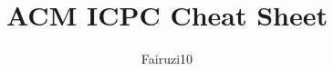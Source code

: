 \documentclass[a4paper, landscape]{article}
\title{\textbf{ACM ICPC Cheat Sheet}}
\author{Fairuzi10}
\date{}
\begin{document}
\setlength{\columnseprule}{0.4pt}
\begin{multicols}{5}
	\tableofcontents
\end{multicols}
\setlength{\columnseprule}{0pt}

\begin{multicols*}{2}
	\maketitle

	
	
	
	
	

\end{multicols*}
\end{document}

